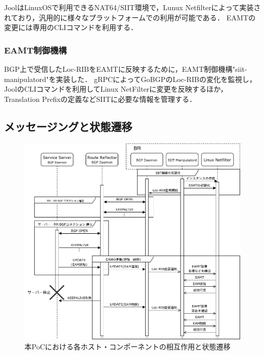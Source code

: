 JoolはLinuxOSで利用できるNAT64/SIIT環境で，Lunux Netfilterによって実装されており，汎用的に様々なプラットフォームでの利用が可能である\cite{Jool,quintero2016performance}．
EAMTの変更には専用のCLIコマンドを利用する．

\subsubsection{EAMT制御機構}
\label{implementation:poc:siit-manipulatord}
BGP上で受信したLoc-RIBをEAMTに反映するために，EAMT制御機構"siit-manipulatord"を実装した．
gRPCによってGoBGPのLoc-RIBの変化を監視し，JoolのCLIコマンドを利用してLinux NetFilterに変更を反映するほか，Translation Prefixの定義などSIITに必要な情報を管理する．

\subsection{メッセージングと状態遷移}
\label{implementation:poc:sequence}

\begin{figure}[H]
    \begin{center}
    \includegraphics[width=15cm,pagebox=cropbox,clip]{img/sequence_manipulatord.pdf}
    \end{center}
    \caption{本PoCにおける各ホスト・コンポーネントの相互作用と状態遷移}
    \label{fig:poc_implementation}
\end{figure}

